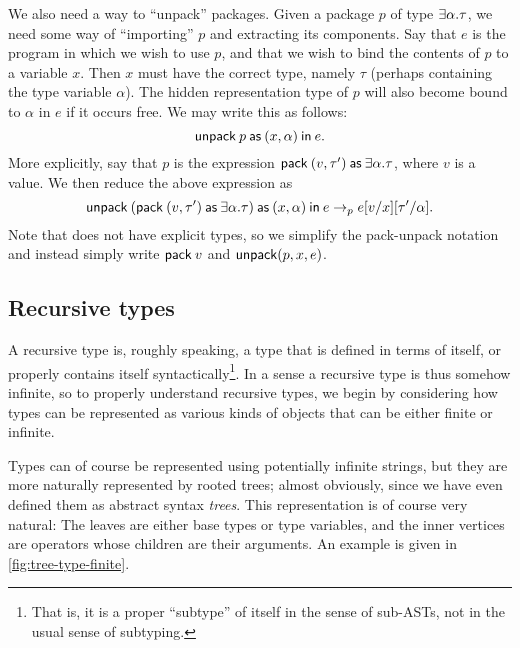 We also need a way to \enquote{unpack} packages. Given a package $p$ of type $\typeExists{\alpha}{\tau}$, we need some way of \enquote{importing} $p$ and extracting its components. Say that $e$ is the program in which we wish to use $p$, and that we wish to bind the contents of $p$ to a variable $x$. Then $x$ must have the correct type, namely $\tau$ (perhaps containing the type variable $\alpha$). The hidden representation type of $p$ will also become bound to $\alpha$ in $e$ if it occurs free. We may write this as follows:
%
\begin{equation*}
    \expUnpackAs{p}{x}{\alpha}{e}. %
\end{equation*}
%
More explicitly, say that $p$ is the expression $\expPackAs{v}{\tau'}{\alpha}{\tau}$, where $v$ is a value. We then reduce the above expression as
%
\begin{equation*}
    \expUnpackAs{
        (\expPackAs{v}{\tau'}{\alpha}{\tau})
    }{x}{\alpha}{e}
        \purestep e[v/x][\tau'/\alpha].
\end{equation*}
%
Note that \langrecref{} does not have explicit types, so we simplify the pack-unpack notation and instead simply write $\expPack{v}$ and $\mathsf{unpack}(p,x,e)$.


\subsection{Recursive types}\label{sec:recursive-types}\label{type!recursive}

A recursive type is, roughly speaking, a type that is defined in terms of itself, or properly contains itself syntactically\footnote{That is, it is a proper \enquote{subtype} of itself in the sense of sub-ASTs, not in the usual sense of subtyping.}. In a sense a recursive type is thus somehow infinite, so to properly understand recursive types, we begin by considering how types can be represented as various kinds of objects that can be either finite or infinite.

Types can of course be represented using potentially infinite strings, but they are more naturally represented by rooted trees; almost obviously, since we have even defined them as abstract syntax \emph{trees}. This representation is of course very natural: The leaves are either base types or type variables, and the inner vertices are operators whose children are their arguments. An example is given in \cref{fig:tree-type-finite}.

